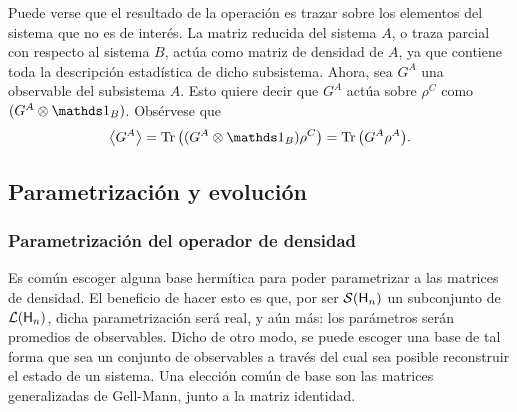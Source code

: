 
Puede verse que el resultado de la operación es trazar sobre los elementos del sistema que no es de interés. La matriz reducida del sistema $A$, o traza parcial con respecto al sistema $B$, actúa como matriz de densidad de $A$, ya que contiene toda la descripción estadística de dicho subsistema. Ahora, sea $G^{A}$ una observable del subsistema $A$. Esto quiere decir que $G^{A}$ actúa sobre $\rho^{C}$ como $(G^{A}\otimes \Id_{B})$. Obsérvese que
\begin{equation}
    \expval{G^{A}}=\Tr\qty((G^A\otimes \Id_B)\rho^C)=\Tr \qty( G^A \rho^A ).\nonumber
\end{equation}

\subsection{Parametrización y evolución}
\label{subsec:ch2_evol_param}

\subsubsection{Parametrización del operador de densidad}


Es común escoger alguna base hermítica para poder parametrizar a las matrices de densidad. El beneficio de hacer esto es que, por ser $\mathcal{S}({\sf H}_{n})$ un subconjunto de $\mathcal{L}({\sf H}_{n})$, dicha parametrización será real, y aún más: los parámetros serán promedios de observables. Dicho de otro modo, se puede escoger una base de tal forma que sea un conjunto de observables a través del cual sea posible reconstruir el estado de un sistema. Una elección común de base son las matrices generalizadas de Gell-Mann, junto a la matriz identidad.

